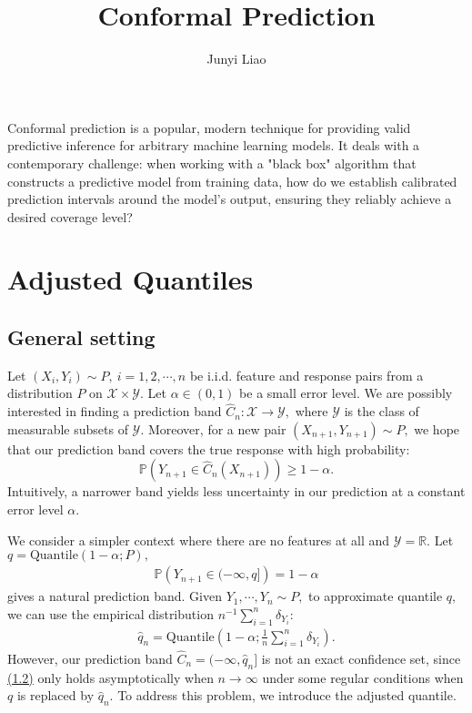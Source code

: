 \documentclass{article}
\title{\bf Conformal Prediction}
\author{Junyi Liao}
\date{}
\numberwithin{equation}{section}
\begin{document}
\maketitle

Conformal prediction is a popular, modern technique for providing valid
predictive inference for arbitrary machine learning models. It deals with a contemporary challenge: when working with a "black box" algorithm that constructs a predictive model from training data, how do we establish calibrated prediction intervals around the model's output, ensuring they reliably achieve a desired coverage level? 

\section{Adjusted Quantiles}
\subsection{General setting}
Let $(X_i,Y_i)\sim P,\ i=1,2,\cdots,n$ be i.i.d. feature and response pairs from a distribution $P$ on $\mathcal{X}\times\mathcal{Y}.$ Let $\alpha\in(0,1)$ be a small error level. We are possibly interested in finding a prediction band $\widehat{C}_n:\mathcal{X}\to\mathscr{Y},$ where $\mathscr{Y}$ is the class of measurable subsets of $\mathcal{Y}.$ Moreover, for a new pair $(X_{n+1},Y_{n+1})\sim P,$ we hope that our prediction band covers the true response with high probability: 
\begin{equation*}
	\mathbb{P}\left(Y_{n+1}\in\widehat{C}_n(X_{n+1})\right) \geq 1-\alpha.\tag{1.1}\label{1.1}
\end{equation*}
Intuitively, a narrower band yields less uncertainty in our prediction at a constant error level $\alpha$.

We consider a simpler context where there are no features at all and $\mathcal{Y}=\mathbb{R}.$ Let $q=\mathrm{Quantile}(1-\alpha;P),$
\begin{align*}
	\mathbb{P}\left(Y_{n+1}\in(-\infty,q]\right) = 1-\alpha\tag{1.2}\label{1.2}
\end{align*}
gives a natural prediction band. Given $Y_1,\cdots,Y_n\sim P,$ to approximate quantile $q,$ we can use the empirical distribution $n^{-1}\sum_{i=1}^n\delta_{Y_i}$:
\begin{align*}
	\widehat{q}_n = \mathrm{Quantile}\left(1-\alpha;\frac{1}{n}\sum_{i=1}^n\delta_{Y_i}\right).\tag{1.3}
\end{align*}
However, our prediction band $\widehat{C}_n=(-\infty,\widehat{q}_n]$ is not an exact confidence set, since \hyperref[1.2]{(1.2)} only holds asymptotically when $n\to\infty$ under some regular conditions when $q$ is replaced by $\widehat{q}_n.$ To address this problem, we introduce the adjusted quantile.
\end{document}
